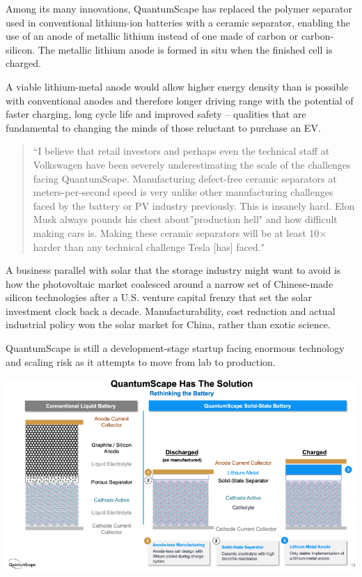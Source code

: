 \documentclass[
]{book}
\begin{document}
Among its many innovations, QuantumScape has replaced the polymer separator used in conventional lithium-ion batteries with a ceramic separator, enabling the use of an anode of metallic lithium instead of one made of carbon or carbon-silicon. The metallic lithium anode is formed in situ when the finished cell is charged.

A viable lithium-metal anode would allow higher energy density than is possible with conventional anodes and therefore longer driving range with the potential of faster charging, long cycle life and improved safety -- qualities that are fundamental to changing the minds of those reluctant to purchase an EV.

\begin{quote}
``I believe that retail investors and perhaps even the technical staff at Volkswagen have been severely underestimating the scale of the challenges facing QuantumScape. Manufacturing defect-free ceramic separators at meters-per-second speed is very unlike other manufacturing challenges faced by the battery or PV industry previously. This is insanely hard. Elon Musk always pounds his chest about''production hell" and how difficult making cars is. Making these ceramic separators will be at least 10× harder than any technical challenge Tesla {[}has{]} faced."
\end{quote}

A business parallel with solar that the storage industry might want to avoid is how the photovoltaic market coalesced around a narrow set of Chinese-made silicon technologies after a U.S. venture capital frenzy that set the solar investment clock back a decade. Manufacturability, cost reduction and actual industrial policy won the solar market for China, rather than exotic science.

QuantumScape is still a development-stage startup facing enormous technology and scaling risk as it attempts to move from lab to production.

\includegraphics{fig/quantumscape.png}
\end{document}
